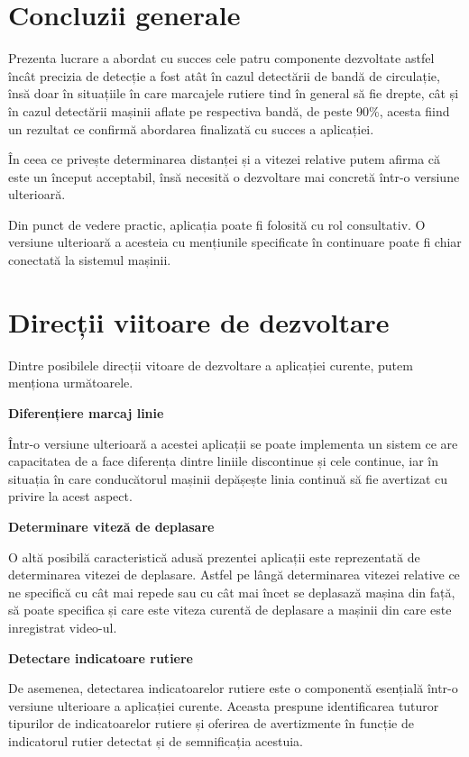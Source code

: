 \section*{Concluzii generale}
Prezenta lucrare a abordat cu succes cele patru componente dezvoltate astfel încât precizia de detecție a fost atât în cazul detectării de bandă de circulație, însă doar în situațiile în care marcajele rutiere tind în general să fie drepte, cât și în cazul detectării mașinii aflate pe respectiva bandă, de peste 90\%, acesta fiind un rezultat ce confirmă abordarea finalizată cu succes a aplicației.  

În ceea ce privește determinarea distanței și a vitezei relative putem afirma că este un început acceptabil, însă necesită o dezvoltare mai concretă într-o versiune ulterioară.

Din punct de vedere practic, aplicația poate fi folosită cu rol consultativ. O versiune ulterioară a acesteia cu mențiunile specificate în continuare poate fi chiar conectată la sistemul mașinii.

\section*{Direcții viitoare de dezvoltare}
Dintre posibilele direcții vitoare de dezvoltare a aplicației curente, putem menționa următoarele.

\textbf{Diferențiere marcaj linie}

Într-o versiune ulterioară a acestei aplicații se poate implementa un sistem ce are capacitatea de a face diferența dintre liniile discontinue și cele continue, iar în situația în care conducătorul mașinii depășește linia continuă să fie avertizat cu privire la acest aspect.

\textbf{Determinare viteză de deplasare}

O altă posibilă caracteristică adusă prezentei aplicații este reprezentată de determinarea vitezei de deplasare. Astfel pe lângă determinarea vitezei relative ce ne specifică cu cât mai repede sau cu cât mai încet se deplasază mașina din față, să poate specifica și care este viteza curentă de deplasare a mașinii din care este inregistrat video-ul.

\textbf{Detectare indicatoare rutiere}

De asemenea, detectarea indicatoarelor rutiere este o componentă esențială într-o versiune ulterioare a aplicației curente. Aceasta prespune identificarea tuturor tipurilor de indicatoarelor rutiere și oferirea de avertizmente în funcție de indicatorul rutier detectat și de semnificația acestuia.

